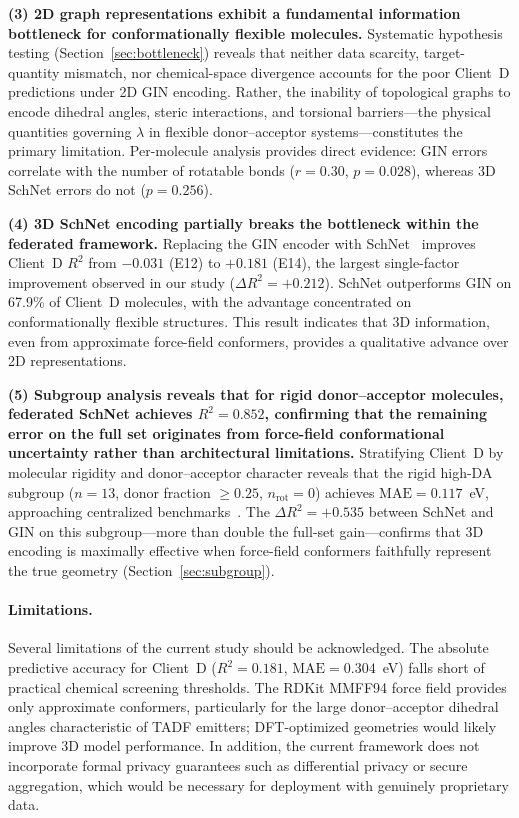 \documentclass[twocolumn]{article}
\newcommand{\lam}{\lambda}
\newcommand{\Rsq}{R^{2}}
\begin{document}
\textbf{(3) 2D graph representations exhibit a fundamental information bottleneck for conformationally flexible molecules.}
Systematic hypothesis testing (Section~\ref{sec:bottleneck}) reveals that neither data scarcity, target-quantity mismatch, nor chemical-space divergence accounts for the poor Client~D predictions under 2D GIN encoding.
Rather, the inability of topological graphs to encode dihedral angles, steric interactions, and torsional barriers---the physical quantities governing $\lam$ in flexible donor--acceptor systems---constitutes the primary limitation.
Per-molecule analysis provides direct evidence: GIN errors correlate with the number of rotatable bonds ($r = 0.30$, $p = 0.028$), whereas 3D SchNet errors do not ($p = 0.256$).

\textbf{(4) 3D SchNet encoding partially breaks the bottleneck within the federated framework.}
Replacing the GIN encoder with SchNet~\cite{Schutt2018_SchNet} improves Client~D $\Rsq$ from $-0.031$ (E12) to $+0.181$ (E14), the largest single-factor improvement observed in our study ($\Delta \Rsq = +0.212$).
SchNet outperforms GIN on 67.9\% of Client~D molecules, with the advantage concentrated on conformationally flexible structures.
This result indicates that 3D information, even from approximate force-field conformers, provides a qualitative advance over 2D representations.

\textbf{(5) Subgroup analysis reveals that for rigid donor--acceptor molecules, federated SchNet achieves $\Rsq = 0.852$, confirming that the remaining error on the full set originates from force-field conformational uncertainty rather than architectural limitations.}
Stratifying Client~D by molecular rigidity and donor--acceptor character reveals that the rigid high-DA subgroup ($n = 13$, donor fraction $\geq 0.25$, $n_{\text{rot}} = 0$) achieves $\text{MAE} = 0.117$~eV, approaching centralized benchmarks~\cite{Li2023_SchNet}.
The $\Delta \Rsq = +0.535$ between SchNet and GIN on this subgroup---more than double the full-set gain---confirms that 3D encoding is maximally effective when force-field conformers faithfully represent the true geometry (Section~\ref{sec:subgroup}).

\paragraph{Limitations.}
Several limitations of the current study should be acknowledged.
The absolute predictive accuracy for Client~D ($\Rsq = 0.181$, $\text{MAE} = 0.304$~eV) falls short of practical chemical screening thresholds.
The RDKit MMFF94 force field provides only approximate conformers, particularly for the large donor--acceptor dihedral angles characteristic of TADF emitters; DFT-optimized geometries would likely improve 3D model performance.
In addition, the current framework does not incorporate formal privacy guarantees such as differential privacy or secure aggregation, which would be necessary for deployment with genuinely proprietary data.
\end{document}
